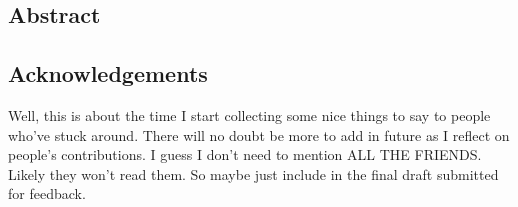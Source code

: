 \hypertarget{abstract}{%
\subsection{Abstract}\label{abstract}}

\hypertarget{acknowledgements}{%
\subsection{Acknowledgements}\label{acknowledgements}}

Well, this is about the time I start collecting some nice things to say
to people who've stuck around. There will no doubt be more to add in
future as I reflect on people's contributions. I guess I don't need to
mention ALL THE FRIENDS. Likely they won't read them. So maybe just
include in the final draft submitted for feedback.

